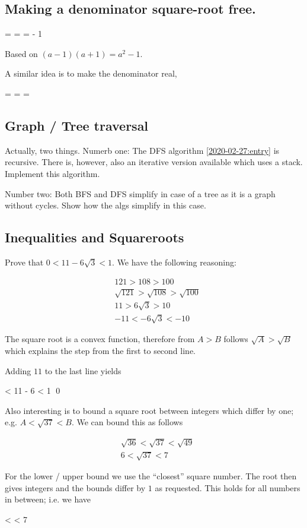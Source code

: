 
\subsection{Making a denominator square-root free.}

\bee
{} =  =  =  - 1
\eee

Based on $(a-1)(a+1) = a^2 - 1$.

A similar idea is to make the denominator real,

\bee
{} =  =  = 
\eee


\subsection{Graph / Tree traversal}

Actually, two things. Numerb one: The DFS algorithm \ref{2020-02-27:entry} is recursive. There is, however, also an iterative version available which uses a stack. Implement this algorithm.

Number two: Both BFS and DFS simplify in case of a tree as it is a graph without cycles. Show how the algs simplify in this case.


\subsection{Inequalities and Squareroots}

Prove that $0 < 11 - 6 \sqrt{3} < 1$. We have the following reasoning:

\begin{align*}
  &121 > 108 > 100 \\
  &\sqrt{121} > \sqrt{108} > \sqrt{100} \\
  &11 > 6 \sqrt{3} > 10 \\
  &-11 < -6 \sqrt{3}  < -10
\end{align*}

The square root is a convex function, therefore from $A > B$ follows $\sqrt{A} > \sqrt{B}$ which explains the step from the first to second line.

Adding $11$ to the last line yields

 < 11 - 6  < 1 \qed
\eee

Also interesting is to bound a square root between integers which differ by one; e.g. $A < \sqrt{37} < B$. We can bound this as follows

\begin{align*}
  &\sqrt{36} < \sqrt{37} < \sqrt{49} \\
  & 6 < \sqrt{37} < 7
\end{align*}

For the lower / upper bound we use the ``closest'' square number. The root then gives integers and the bounds differ by $1$ as requested. This holds for all numbers in between; i.e. we have

 <  \cdots {} < 7
\eee




